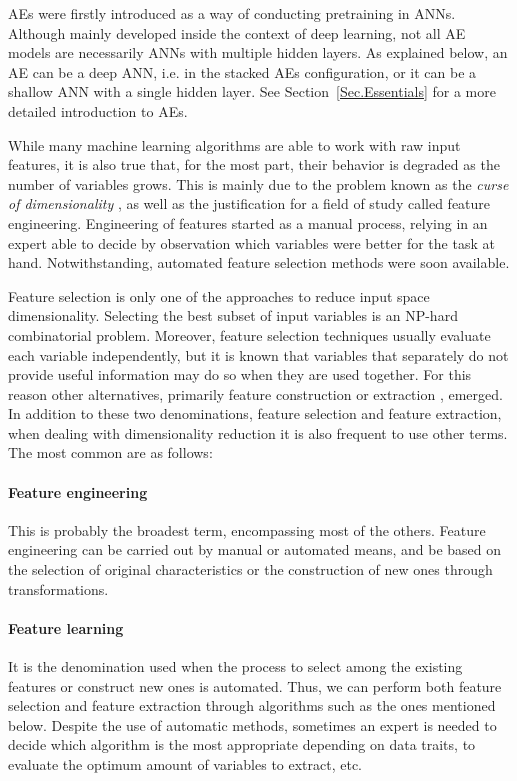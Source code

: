\documentclass[preprint,5p,compress]{elsarticle}
\begin{document}
AEs were firstly introduced \cite{AEs} as a way of conducting pretraining in ANNs. Although mainly developed inside the context of deep learning, not all AE models are necessarily ANNs with multiple hidden layers. As explained below, an AE can be a deep ANN, i.e. in the stacked AEs configuration, or it can be a shallow ANN with a single hidden layer. See Section~\ref{Sec.Essentials} for a more detailed introduction to AEs.

While many machine learning algorithms are able to work with raw input features, it is also true that, for the most part, their behavior is degraded as the number of variables grows. This is mainly due to the problem known as the \textit{curse of dimensionality} \cite{Richard1957}, as well as the justification for a field of study called feature engineering. Engineering of features started as a manual process, relying in an expert able to decide by observation which variables were better for the task at hand. Notwithstanding, automated feature selection \cite{FeatureSelection} methods were soon available.

Feature selection is only one of the approaches to reduce input space dimensionality. Selecting the best subset of input variables is an NP-hard combinatorial problem. Moreover, feature selection techniques usually evaluate each variable independently, but it is known that variables that separately do not provide useful information may do so when they are used together. For this reason other alternatives, primarily feature construction or extraction \cite{FeatureExtraction}, emerged. In addition to these two denominations, feature selection and feature extraction, when dealing with dimensionality reduction it is also frequent to use other terms. The most common are as follows:

	\paragraph{Feature engineering \cite{Domingos2012AFU}}
	This is probably the broadest term, encompassing most of the others. Feature engineering can be carried out by manual or automated means, and be based on the selection of original characteristics or the construction of new ones through transformations. 

	\paragraph{Feature learning \cite{bengio_representation_2013}}
	It is the denomination used when the process to select among the existing features or construct new ones is automated. Thus, we can perform both feature selection and feature extraction through algorithms such as the ones mentioned below. Despite the use of automatic methods, sometimes an expert is needed to decide which algorithm is the most appropriate depending on data traits, to evaluate the optimum amount of variables to extract, etc.
	
\end{document}
